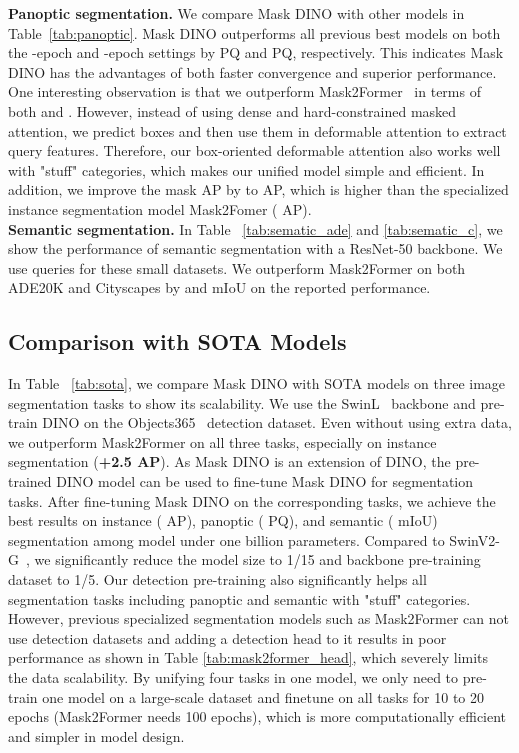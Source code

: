 \documentclass[10pt,twocolumn,letterpaper]{article}
\begin{document}
 \noindent\textbf{Panoptic segmentation.} We compare Mask DINO with other models in Table~\ref{tab:panoptic}. Mask DINO outperforms all previous best models on both the -epoch and -epoch settings by  PQ and  PQ, respectively. This indicates Mask DINO has the advantages of both faster convergence and superior performance. One interesting observation is that we outperform Mask2Former~\cite{cheng2021mask2former} in terms of both  and . However, instead of using dense and hard-constrained masked attention, we predict boxes and then use them in deformable attention to extract query features. Therefore, our box-oriented deformable attention also works well with "stuff" categories,  which makes our unified model simple and efficient. 
In addition, we improve the mask AP by  to  AP, which is  higher than the specialized instance segmentation model Mask2Fomer ( AP).
\\\textbf{Semantic segmentation.} In Table ~\ref{tab:sematic_ade} and \ref{tab:sematic_c}, we show the performance of semantic segmentation with a ResNet-50 backbone. We use  queries for these small datasets. We outperform Mask2Former on both ADE20K and Cityscapes by  and  mIoU on the reported performance.


\subsection{Comparison with SOTA Models}
In Table ~\ref{tab:sota}, we compare Mask DINO with SOTA models on three image segmentation tasks to show its scalability. We use the SwinL~\cite{liu2021swin} backbone and pre-train DINO on the Objects365~\cite{shao2019objects365} detection dataset. Even without using extra data, we outperform Mask2Former on all three tasks, especially on instance segmentation (\textbf{+2.5 AP}). As Mask DINO is an extension of DINO, the pre-trained DINO model can be used to fine-tune Mask DINO for segmentation tasks. After fine-tuning Mask DINO on the corresponding tasks, we achieve the best results on instance ( AP), panoptic (  PQ), and semantic ( mIoU) segmentation among model under one billion parameters. Compared to SwinV2-G~\cite{liu2021swinv2}, we significantly reduce the model size to 1/15 and backbone pre-training dataset to 1/5. Our detection pre-training also significantly helps all segmentation tasks including panoptic and semantic with "stuff" categories. However, previous specialized segmentation models such as Mask2Former can not use detection datasets and adding a detection head to it results in poor performance as shown in Table \ref{tab:mask2former_head}, which severely limits the data scalability. By unifying four tasks in one model, we only need to pre-train one model on a large-scale dataset and finetune on all tasks for 10 to 20 epochs (Mask2Former needs 100 epochs), which is more computationally efficient and simpler in model design.
\end{document}
